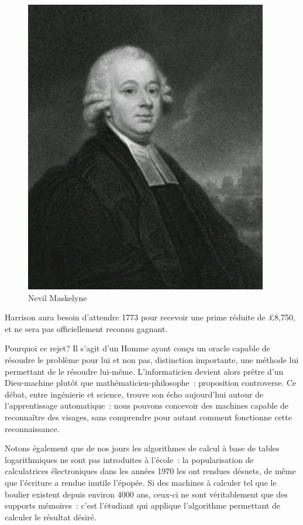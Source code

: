 \begin{minipage}[H]{0.49\linewidth}
  \begin{figure}[H]
  \centering
  \includegraphics[height=0.15\paperheight]{../resources/illustrations/maskelyne}
  \caption{Nevil Maskelyne}
  \end{figure}
\end{minipage}

Harrison aura besoin d'attendre 1773 pour recevoir une prime réduite de \pounds{8,750}, et ne sera pas officiellement reconnu gagnant.

Pourquoi ce rejet? Il s'agit d'un Homme ayant conçu un \og{}oracle\fg{} capable de résoudre le problème pour lui et non pas, distinction importante, une méthode lui permettant de le résoudre lui-même. L'informaticien devient alors prêtre d'un Dieu-machine plutôt que mathématicien-philosophe~: proposition controverse. Ce débat, entre ingénierie et science, trouve son écho aujourd'hui autour de l'apprentissage automatique~: nous pouvons concevoir des machines capable de reconnaître des visages, sans comprendre pour autant comment fonctionne cette reconnaissance. 

Notons également que de nos jours les algorithmes de calcul à base de tables logarithmiques ne sont pas introduites à l'école~: la popularisation de calculatrices électroniques dans les années 1970 les ont rendues désuets, de même que l'écriture a rendue inutile l'épopée. Si des machines à calculer tel que le boulier existent depuis environ 4000 ans, ceux-ci ne sont véritablement que des supports mémoires~: c'est l'étudiant qui applique l'algorithme permettant de calculer le résultat désiré. 

